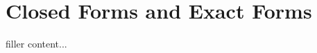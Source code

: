 \documentclass[../../templates/section]{subfiles}
\begin{document}
\section{Closed Forms and Exact Forms}\label{sec:closed-forms-and-exact-forms}

filler content...
\end{document}
